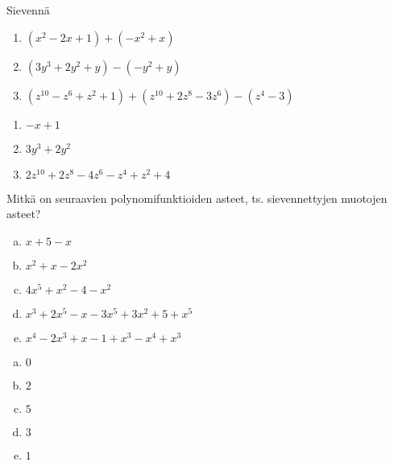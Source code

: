 \begin{tehtava}
    Sievennä
    \begin{enumerate}
        \item $(x^2 - 2x + 1) + (-x^2 + x) $
        \item $(3y^3 + 2y^2  + y) - (-y^2 + y)$
        \item $(z^{10} - z^6 + z^2 + 1) + (z^{10} + 2z^8 - 3z^6) - (z^4 - 3)$
    \end{enumerate}
    \begin{vastaus}
        \begin{enumerate}
            \item $-x + 1$
            \item $3y^3 + 2y^2$
            \item $2z^{10} + 2z^8 - 4z^6 - z^4 + z^2 + 4$
        \end{enumerate}
    \end{vastaus}
\end{tehtava}

\begin{tehtava}
	Mitkä on seuraavien polynomifunktioiden asteet, ts. sievennettyjen muotojen asteet?
	\begin{enumerate}[a)]
		\item $x+5-x$
		\item $x^2+x-2x^2$
		\item $4x^5+x^2-4-x^2$
		\item $x^3+2x^5-x-3x^5+3x^2+5+x^5$
		\item $x^4-2x^3+x-1+x^3-x^4+x^3$
	\end{enumerate}

	\begin{vastaus}
		\begin{enumerate}[a)]
			\item $0$
			\item $2$
			\item $5$
			\item $3$
			\item $1$
		\end{enumerate}
	\end{vastaus}
\end{tehtava}

